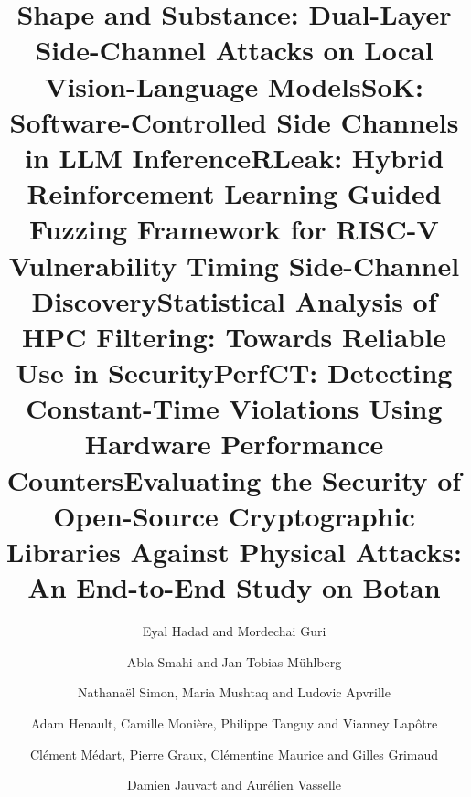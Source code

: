 \documentclass[runningheads]{llncs}
\begin{document}
\mainmatter


\setcounter{page}{1}
\author{Eyal Hadad and Mordechai Guri}
\title{Shape and Substance: Dual-Layer Side-Channel Attacks on Local Vision-Language Models}
\maketitle
\clearpage

\setcounter{page}{2}
\author{Abla Smahi and Jan Tobias M\"uhlberg}
\title{SoK: Software-Controlled Side Channels in LLM Inference}
\maketitle
\clearpage

\setcounter{page}{3}
\author{Nathanaël Simon, Maria Mushtaq and Ludovic Apvrille}
\title{RLeak: Hybrid Reinforcement Learning Guided Fuzzing Framework for RISC-V Vulnerability Timing Side-Channel Discovery}
\maketitle
\clearpage

\setcounter{page}{4}
\author{Adam Henault, Camille Monière, Philippe Tanguy and Vianney Lapôtre}
\title{Statistical Analysis of HPC Filtering: Towards Reliable Use in Security}
\maketitle
\clearpage

\setcounter{page}{5}
\author{Clément Médart, Pierre Graux, Clémentine Maurice and Gilles Grimaud}
\title{PerfCT: Detecting Constant-Time Violations Using Hardware Performance Counters}
\maketitle
\clearpage

\setcounter{page}{6}
\author{Damien Jauvart and Aurélien Vasselle}
\title{Evaluating the Security of Open-Source Cryptographic Libraries Against Physical Attacks: An End-to-End Study on Botan}
\maketitle
\clearpage
\end{document}
